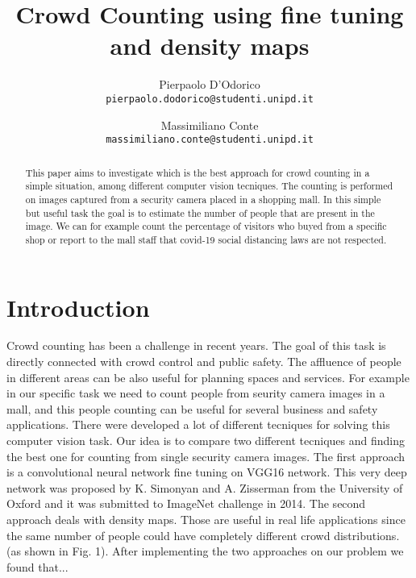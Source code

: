 \documentclass[10pt,twocolumn,letterpaper]{article}
\begin{document}
\title{Crowd Counting using fine tuning and density maps}

\author{Pierpaolo D'Odorico\\
{\tt\small pierpaolo.dodorico@studenti.unipd.it}
\and
Massimiliano Conte\\
{\tt\small massimiliano.conte@studenti.unipd.it}
}


\maketitle
\begin{abstract}

This paper aims to investigate which is the best approach for crowd counting in a simple situation, among different computer vision tecniques. The counting is performed on images captured from a security camera placed in a shopping mall. In this simple but useful task the goal is to estimate the number of people that are present in the image. We can for example count the percentage of visitors who buyed from a specific shop or report to the mall staff that covid-19 social distancing laws are not respected.

\end{abstract}

\section{Introduction}

Crowd counting has been a challenge in recent years. The goal of this task is directly connected with crowd control and public safety. The affluence of people in different areas can be also useful for planning spaces and services. For example in our specific task we need to count people from seurity camera images in a mall, and this people counting can be useful for several business and safety applications. 
There were developed a lot of different tecniques for solving this computer vision task. Our idea is to compare two different tecniques and finding the best one for counting from single security camera images. The first approach is a convolutional neural network fine tuning on VGG16 network.  This very deep network was proposed by K. Simonyan and A. Zisserman from the University of Oxford and it was submitted to ImageNet challenge in 2014. The second approach deals with density maps. Those are useful in real life applications since the same number of people could have completely different crowd distributions. (as shown in Fig. 1). After implementing the two approaches on our problem we found that...
\end{document}
